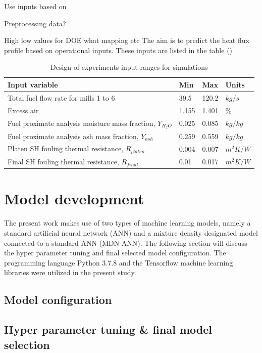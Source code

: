 \documentclass[a4paper,fleqn]{cas-sc}
\begin{document}
Use inputs based on 

Preprocessing data?

High low values for DOE what mapping etc
The aim is to predict the heat flux profile  based on operational inputs. These inputs are listed in the table ()

\begin{table}[h!]
\caption{Design of experiments input ranges for  simulations}\label{tbl_doe}
\begin{tabular*}{\tblwidth}{p{}p{}p{}p{}}
\toprule
 Input variable& Min& Max& Units \\ %
\midrule
 Total fuel flow rate for mills 1 to 6 & 39.5 & 120.2 & $kg/s$ \\
 Excess air & 1.155 & 1.401 & $\%$\\
 Fuel proximate analysis moisture mass fraction, $Y_{H_2O}$ & 0.025 & 0.085 & $kg/kg$ \\
 Fuel proximate analysis ash mass fraction, $Y_{ash}$  & 0.259 & 0.559 & $kg/kg$ \\
 Platen SH fouling thermal resistance, $R_{platen}$  & 0.004 & 0.007 & $m^2K/W$ \\
 Final SH fouling thermal resistance, $R_{final}$  &0.01 & 0.017 & $m^2K/W$ \\
\bottomrule
\end{tabular*}
\end{table}

\section{Model development}

The present work makes use of two types of machine learning models, namely a standard artificial neural network (ANN) and a mixture density designated model connected to a standard ANN (MDN-ANN). The following section will discuss the hyper parameter tuning and final selected model configuration. The programming language Python 3.7.8 and the Tensorflow machine learning libraries were utilized in the present study. 
\subsection{Model configuration}


\subsection{Hyper parameter tuning \& final model selection}
\end{document}
